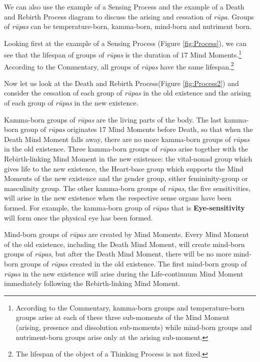 We can also use the example of a Sensing Process and the example of a Death and Rebirth Process diagram to discuss the arising and cessation of \textit{rūpa}. Groups of \textit{rūpas} can be temperature-born, kamma-born, mind-born and nutriment born.

Looking first at the example of a Sensing Process (Figure \ref{fig:Process}), we can see that the lifespan of groups of \textit{rūpas} is the duration of 17 Mind Moments.\footnote{According to the Commentary, kamma-born groups and temperature-born groups arise at each of these three sub-moments of the Mind Moment (arising, presence and dissolution sub-moments) while mind-born groups and nutriment-born groups arise only at the arising sub-moment.} According to the Commentary, all groups of \textit{rūpas} have the same lifespan.\footnote{The lifespan of the object of a Thinking Process is not fixed.}

Now let us look at the Death and Rebirth Process(Figure \ref{fig:Process2}) and consider the cessation of each group of \textit{rūpas} in the old existence and the arising of each group of \textit{rūpas} in the new existence. 

Kamma-born groups of \textit{rūpas} are the living parts of the body. The last kamma-born group of \textit{rūpas} originates 17 Mind Moments before Death, so that when the Death Mind Moment falls away, there are no more kamma-born groups of \textit{rūpas} in the old existence. Three kamma-born groups of \textit{rūpas} arise together with the Rebirth-linking Mind Moment in the new existence: the vital-nonad group which gives life to the new existence, the Heart-base group which supports the Mind Moments of the new existence and the gender group, either femininity-group or masculinity group. The other kamma-born groups of \textit{rūpas}, the five sensitivities, will arise in the new existence when the respective sense organs have been formed. For example, the kamma-born group of \textit{rūpas} that is \textbf{Eye-sensitivity} will form once the physical eye has been formed.

Mind-born groups of \textit{rūpas} are created by Mind Moments. Every Mind Moment of the old existence, including the Death Mind Moment, will create mind-born groups of \textit{rūpas}, but after the Death Mind Moment, there will be no more mind-born groups of \textit{rūpas} created in the old existence. The first mind-born group of \textit{rūpas} in the new existence will arise during the Life-continuum Mind Moment immediately following the Rebirth-linking Mind Moment.

